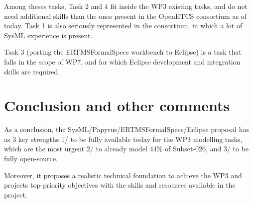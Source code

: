 Among theses tasks, Task 2 and 4 fit inside the WP3 existing tasks, and do not need additional skills than the ones present in the OpenETCS consortium as of today. Task 1 is also seriously represented in the consortium, in which a lot of SysML experience is present. 

Task 3 (porting the ERTMSFormalSpecs workbench to Eclipse) is a task that falls in the scope of WP7, and for which Eclipse development and integration skills are required.

\section{Conclusion and other comments}

As a conclusion, the SysML/Papyrus/ERTMSFormalSpecs/Eclipse proposal has as 3 key strengths 1/ to be fully available today for the WP3 modelling tasks, which are the most urgent 2/ to already model 44\% of Subset-026, and 3/ to be fully open-source. 

Moreover, it proposes a realistic technical foundation to achieve the WP3 and projects top-priority objectives with the skills and resources available in the project.
